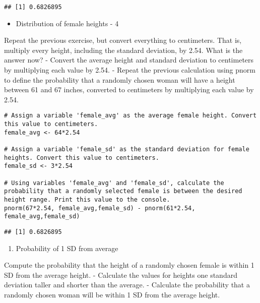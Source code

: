 \documentclass[
]{article}
\providecommand{\tightlist}{%
  \setlength{\itemsep}{0pt}\setlength{\parskip}{0pt}}
\begin{document}
\begin{verbatim}
## [1] 0.6826895
\end{verbatim}

\begin{itemize}
\tightlist
\item
  Distribution of female heights - 4
\end{itemize}

Repeat the previous exercise, but convert everything to centimeters.
That is, multiply every height, including the standard deviation, by
2.54. What is the answer now? - Convert the average height and standard
deviation to centimeters by multiplying each value by 2.54. - Repeat the
previous calculation using pnorm to define the probability that a
randomly chosen woman will have a height between 61 and 67 inches,
converted to centimeters by multiplying each value by 2.54.

\begin{verbatim}
# Assign a variable 'female_avg' as the average female height. Convert this value to centimeters.
female_avg <- 64*2.54

# Assign a variable 'female_sd' as the standard deviation for female heights. Convert this value to centimeters.
female_sd <- 3*2.54

# Using variables 'female_avg' and 'female_sd', calculate the probability that a randomly selected female is between the desired height range. Print this value to the console.
pnorm(67*2.54, female_avg,female_sd) - pnorm(61*2.54, female_avg,female_sd)
\end{verbatim}

\begin{verbatim}
## [1] 0.6826895
\end{verbatim}

\begin{enumerate}
\def\labelenumi{\arabic{enumi}.}
\setcounter{enumi}{4}
\tightlist
\item
  Probability of 1 SD from average
\end{enumerate}

Compute the probability that the height of a randomly chosen female is
within 1 SD from the average height. - Calculate the values for heights
one standard deviation taller and shorter than the average. - Calculate
the probability that a randomly chosen woman will be within 1 SD from
the average height.
\end{document}
